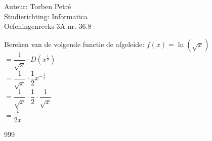 \documentclass[a4paper]{article}
\begin{document}
  
\noindent \large Auteur: Torben Petré \\
\noindent \large Studierichting: Informatica\\
\noindent \large Oefeningenreeks 3A nr. 36.8\\

\medskip

\normalsize

Bereken van de volgende functie de afgeleide: $f(x) = \ln(\sqrt{x})$\\

$= \dfrac{1}{\sqrt{x}} \cdot D(x^{\tfrac{1}{2}})$\\

$= \dfrac{1}{\sqrt{x}} \cdot \dfrac{1}{2}x^{-\tfrac{1}{2}}$\\

$= \dfrac{1}{\sqrt{x}} \cdot \dfrac{1}{2} \cdot \dfrac{1}{\sqrt{x}}$\\

$= \dfrac{1}{2x}$\\

\begin{thebibliography}{999}
\end{thebibliography}
\end{document}
